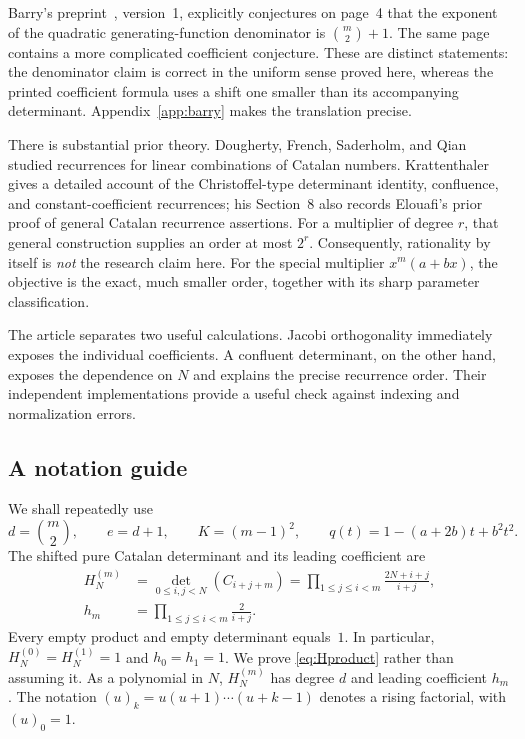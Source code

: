 \documentclass[11pt,a4paper]{article}
\numberwithin{equation}{section}
\theoremstyle{definition}
\theoremstyle{remark}
\newcommand{\HH}[2]{H_{#1}^{(#2)}}
\begin{document}
Barry's preprint~\cite{Barry2020}, version~1, explicitly conjectures on
page~4 that the exponent of the quadratic generating-function denominator
is $\binom m2+1$.  The same page contains a more complicated coefficient
conjecture.  These are distinct statements: the denominator claim is
correct in the uniform sense proved here, whereas the printed coefficient
formula uses a shift one smaller than its accompanying determinant.
Appendix~\ref{app:barry} makes the translation precise.

There is substantial prior theory.  Dougherty, French, Saderholm, and
Qian~\cite{Dougherty2011} studied recurrences for linear combinations of
Catalan numbers.  Krattenthaler~\cite{Krattenthaler2023} gives a detailed
account of the Christoffel-type determinant identity, confluence, and
constant-coefficient recurrences; his Section~8 also records Elouafi's
prior proof of general Catalan recurrence assertions.  For a multiplier
of degree $r$, that general construction supplies an order at most $2^r$.
Consequently, rationality by itself is \emph{not} the research claim here.
For the special multiplier $x^m(a+bx)$, the objective is the exact,
much smaller order, together with its sharp parameter classification.

The article separates two useful calculations.  Jacobi orthogonality
immediately exposes the individual coefficients.  A confluent determinant,
on the other hand, exposes the dependence on $N$ and explains the precise
recurrence order.  Their independent implementations provide a useful
check against indexing and normalization errors.

\subsection{A notation guide}
We shall repeatedly use
\begin{equation}\label{eq:notation}
 d=\binom m2,\qquad e=d+1,\qquad K=(m-1)^2,\qquad
 q(t)=1-(a+2b)t+b^2t^2.
\end{equation}
The shifted pure Catalan determinant and its leading coefficient are
\begin{align}
 \HH{N}{m}&=\det_{0\leq i,j<N}(C_{i+j+m})
 =\prod_{1\leq j\leq i<m}\frac{2N+i+j}{i+j},\label{eq:Hproduct}\\
 h_m&=\prod_{1\leq j\leq i<m}\frac{2}{i+j}.
 \label{eq:h}
\end{align}
Every empty product and empty determinant equals~$1$.  In particular,
$H_N^{(0)}=H_N^{(1)}=1$ and $h_0=h_1=1$.  We prove
\eqref{eq:Hproduct} rather than assuming it.  As a polynomial in $N$,
$H_N^{(m)}$ has degree $d$ and leading coefficient $h_m$.
The notation $(u)_k=u(u+1)\cdots(u+k-1)$ denotes a rising factorial,
with $(u)_0=1$.
\end{document}
